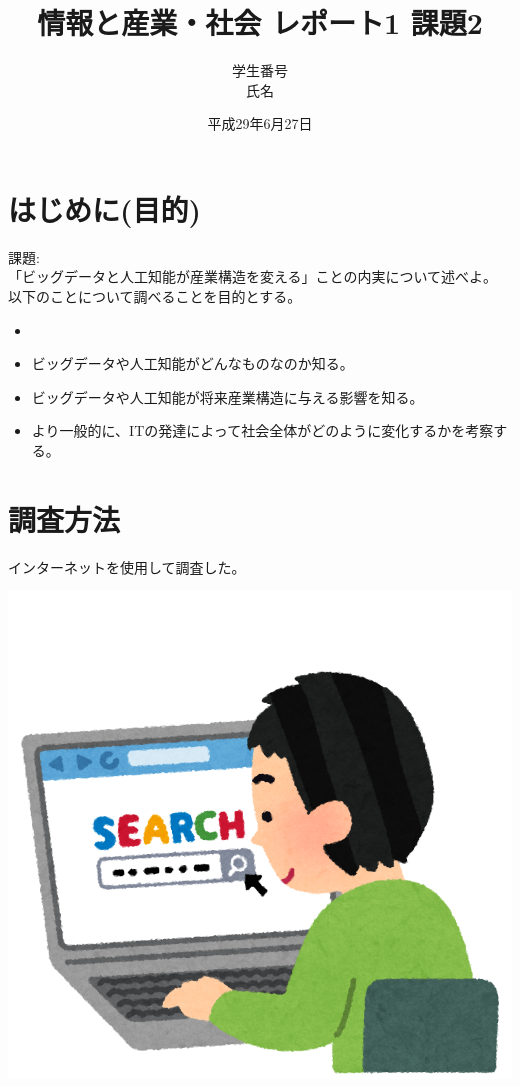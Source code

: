 \documentclass[a4paper,12pt]{jarticle}
\title{情報と産業・社会 レポート1 課題2}
\author{学生番号\\氏名}
\date{平成29年6月27日}
\begin{document}
\maketitle
\tableofcontents
\section{はじめに(目的)}
課題:\\
「ビッグデータと人工知能が産業構造を変える」ことの内実について述べよ。\\
以下のことについて調べることを目的とする。
\begin{itemize}
 \item
 \item ビッグデータや人工知能がどんなものなのか知る。
 \item ビッグデータや人工知能が将来産業構造に与える影響を知る。
 \item より一般的に、ITの発達によって社会全体がどのように変化するかを考察する。
\end{itemize}
\newpage
\section{調査方法}
インターネットを使用して調査した。
\begin{center}
\includegraphics[width=100truemm]{computer_search_kensaku.png}
\end{center}
\end{document}
